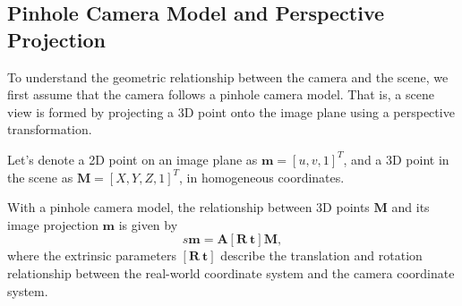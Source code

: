 \subsection{Pinhole Camera Model and Perspective Projection}
To understand the geometric relationship between the camera and the scene, we first assume that the camera follows a pinhole camera model. That is, a scene view is formed by projecting a 3D point onto the image plane using a perspective transformation. 

Let's denote a 2D point on an image plane as $\mathbf{m}=[u, v, 1]^{T}$, and a 3D point in the scene as $\mathbf{M}=[X, Y, Z, 1]^{T}$, in homogeneous coordinates.

With a pinhole camera model, the relationship between 3D points $\mathbf{M}$ and its image projection $\mathbf{m}$ is given by
\begin{equation}
s \mathbf{m} = \mathbf{A} [ \mathbf{R} ~ \mathbf{t} ] \mathbf{M}, 
\label{pinhole_model}
\end{equation}
where the extrinsic parameters $[\mathbf{R} ~ \mathbf{t}]$ describe the translation and rotation relationship between the real-world coordinate system and the camera coordinate system. 

